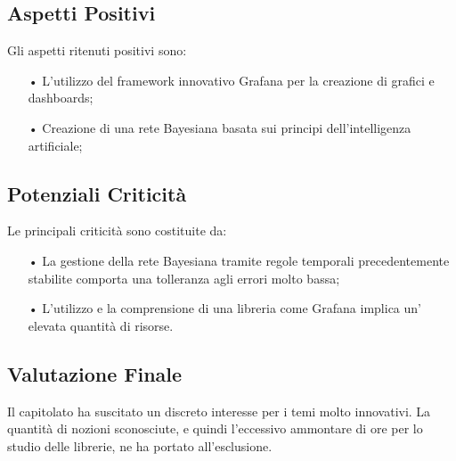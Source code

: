 \subsection{Aspetti Positivi}

Gli aspetti ritenuti positivi sono: 
\begin{itemize}

\item[•] L'utilizzo del framework innovativo Grafana per la creazione di grafici e dashboards;
\item[•] Creazione di una rete Bayesiana basata sui principi dell'intelligenza artificiale;

\end{itemize}

\subsection{Potenziali Criticità}
Le principali criticità sono costituite da: 
\begin{itemize}

\item[•]La gestione della rete Bayesiana tramite regole temporali precedentemente stabilite comporta una tolleranza agli errori molto bassa;

\item[•] L'utilizzo e la comprensione di una libreria come Grafana implica un' elevata quantità di risorse.

\end{itemize}


\subsection{Valutazione Finale}
Il capitolato ha suscitato un discreto interesse per i temi molto innovativi. 
La quantità di nozioni sconosciute, e quindi l'eccessivo ammontare di ore per lo studio delle librerie, ne ha portato all'esclusione. 